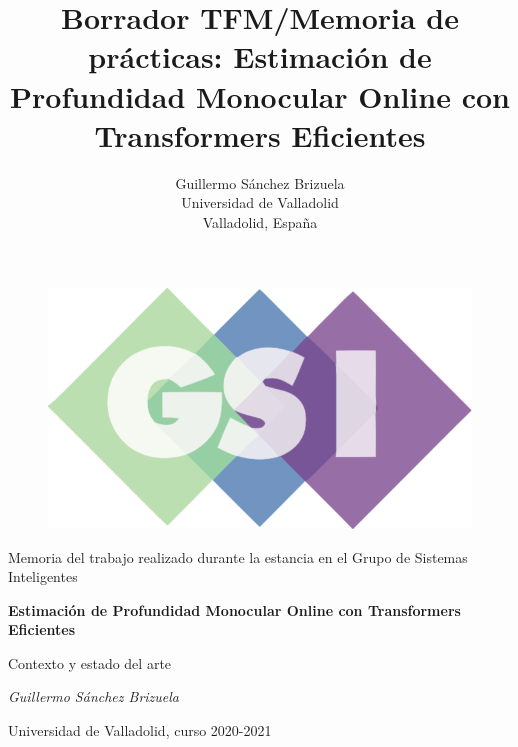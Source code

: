 \documentclass[a4paper, 11pt]{article}
\title{Borrador TFM/Memoria de prácticas: Estimación de Profundidad Monocular Online con Transformers Eficientes}
\author{Guillermo Sánchez Brizuela\\
  \small Universidad de Valladolid\\
  \small Valladolid, España
  \date{}
}
\begin{document}
\begin{titlepage}
\centering
\begin{figure}[t]
	\centering
	\includegraphics[scale=0.35]{imagenes/gsi.png}
    \vspace{0.5cm}
\end{figure}%
	{\LARGE Memoria del trabajo realizado durante la estancia en el Grupo de Sistemas Inteligentes\par}
	\vspace{3cm}
	{\huge\bfseries Estimación de Profundidad Monocular Online con Transformers Eficientes\par}
	\vspace{0.5cm}
    {\LARGE Contexto y estado del arte\par}
    \vspace{3cm}
	{\Large\itshape Guillermo Sánchez Brizuela\par}
	\vspace{0.5cm}
	{\Large Universidad de Valladolid, curso 2020-2021\par}
	\vfill
\end{titlepage}


{
    \setcounter{tocdepth}{4}
    \setcounter{secnumdepth}{4}
    \hypersetup{linkcolor=black}
    \tableofcontents
}

\newpage


\end{document}
